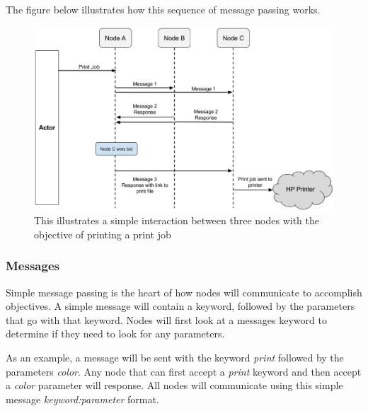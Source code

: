 \documentclass[draftclsnofoot, onecolumn, compsoc, 10pt]{IEEEtran}
\begin{document}
The figure below illustrates how this sequence of message passing works.

\begin{figure}[H]
\centering
	\includegraphics[scale=0.5]{sequence}
	\captionsetup{justification=centering}
    \caption{This illustrates a simple interaction between three nodes with the objective of printing a print job}
\end{figure}

\subsubsection{Messages}
Simple message passing is the heart of how nodes will communicate to accomplish objectives. A simple message will contain a keyword, followed by the parameters that go with that keyword. Nodes will first look at a messages keyword to determine if they need to look for any parameters. 

As an example, a message will be sent with the keyword \textit{print} followed by the parameters \textit{color}. Any node that can first accept a \textit{print} keyword and then accept a \textit{color} parameter will response. All nodes will communicate using this simple message  \textit{keyword:parameter} format. 
\end{document}
